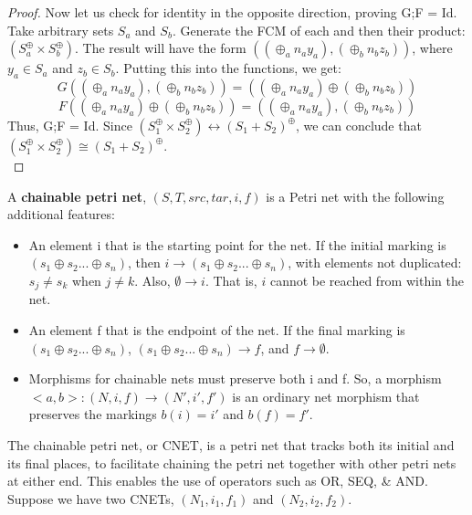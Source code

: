 \begin{lemma}
\begin{proof}
Now let us check for identity in the opposite direction, proving G;F = Id.\\
Take arbitrary sets $S_a$ and $S_b$. Generate the FCM of each and then their product: $(S_a^\oplus \times S_b^\oplus)$. The result will have the form $((\oplus_a n_a y_a), (\oplus_b n_b z_b))$, where $y_a \in S_a$ and $z_b \in S_b$. Putting this into the functions, we get:\\ 
\[G((\oplus_a n_a y_a), (\oplus_b n_b z_b)) = ((\oplus_a n_a y_a) \oplus (\oplus_b n_b z_b))\] 
\[F((\oplus_a n_a y_a) \oplus (\oplus_b n_b z_b)) = ((\oplus_a n_a y_a), (\oplus_b n_b z_b))\]
Thus, G;F = Id. 
Since $(S_1 ^\oplus \times S_2 ^\oplus) \leftrightarrow (S_1 + S_2)^\oplus$, we can conclude that $(S_1 ^\oplus \times S_2 ^\oplus) \cong (S_1 + S_2)^\oplus$.\\
\end{proof}
%
\end{lemma}
%
\begin{definition}
  \label{Chainable-Petri-Net}
  A \textbf{chainable petri net}, $(S, T, src, tar, i, f)$ is a Petri net with the following additional features: 
  \begin{itemize}
  \item An element i that is the starting point for the net. If the initial marking is $(s_1 \oplus s_2 ... \oplus s_n)$, then $i \to (s_1 \oplus s_2 ... \oplus s_n)$, with elements not duplicated: $s_j \neq s_k$ when $j \neq k$. Also, $\emptyset \to i$. That is, $i$ cannot be reached from within the net. 
  \item An element f that is the endpoint of the net. If the final marking is $(s_1 \oplus s_2 ... \oplus s_n)$, $(s_1 \oplus s_2 ... \oplus s_n) \to f$, and $f \to \emptyset$. 
   \item Morphisms for chainable nets must preserve both i and f. So, a morphism $<a,b>: (N, i, f) \to (N', i', f')$ is an ordinary net morphism that preserves the markings $b(i) = i'$ and $b(f) = f'$. 
 \end{itemize}
\end{definition}
The chainable petri net, or CNET, is a petri net that tracks both its initial and its final places, to facilitate chaining the petri net together with other petri nets at either end. This enables the use of operators such as OR, SEQ, \& AND.\\
Suppose we have two CNETs, $(N_1, i_1, f_1)$ and $(N_2, i_2, f_2)$. \\
